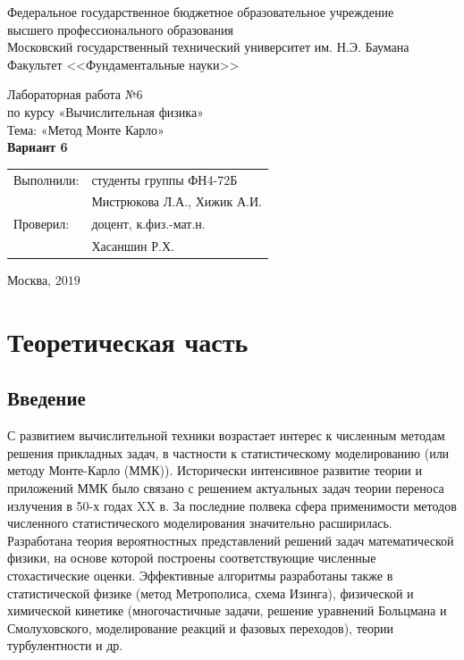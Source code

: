 \documentclass[
11pt,
master, %
subf, %
href, %
colorlinks=true, %
times, %
]{disser}
\begin{document}
	
\pagestyle{empty}
\begin{center}
	
	\noindent  Федеральное государственное бюджетное образовательное учреждение\\
	высшего профессионального образования\\
	
	Московский государственный технический университет им. Н.Э. Баумана \\
	Факультет <<Фундаментальные науки>>\bigskip\\
	
	\vfill
	
	Лабораторная работа №6\\
	по курсу «Вычислительная физика»\\
	Тема: «Метод Монте Карло»\\
	\textbf{Вариант 6}\\
	
	
	\vfill
	\vfill
	\begin{flushright}
		\begin{tabular}{ll}
			Выполнили: & студенты группы ФН4-72Б     \\
			& Мистрюкова Л.А., Хижик А.И.  \\
			Проверил:  & доцент, к.физ.-мат.н.       \\
			& Хасаншин Р.Х.
		\end{tabular}
	\end{flushright}
	\vfill
	\begin{center}
		Москва, $2019$
	\end{center}
	
\end{center}
\pagebreak
	
	
\pagestyle{plain}
\tableofcontents

\section{Теоретическая часть}
\subsection{Введение}
С развитием вычислительной техники возрастает интерес к численным методам решения прикладных задач, в частности к статистическому моделированию (или методу Монте-Карло (ММК)). Исторически интенсивное развитие теории и приложений ММК было связано с решением актуальных задач теории переноса излучения в 50-х годах XX в. За последние полвека сфера применимости методов численного статистического моделирования значительно расширилась. Разработана теория вероятностных представлений решений задач математической физики, на основе которой построены соответствующие численные стохастические оценки. Эффективные алгоритмы разработаны также в статистической физике (метод Метрополиса, схема Изинга), физической и химической кинетике (многочастичные задачи, решение уравнений Больцмана и Смолуховского, моделирование реакций и фазовых переходов), теории турбулентности и др.
\end{document}
